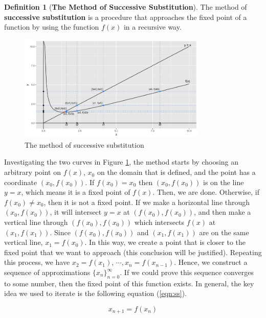 \documentclass{article}
\theoremstyle{definition}
\newtheorem{definition}{Definition}[section]
\theoremstyle{remark}
\theoremstyle{example}
\begin{document}
\begin{definition}[\textbf{The Method of Successive Substitution}]\label{def:MethodSS}
The method of \textbf{successive substitution} is a procedure that approaches the fixed point of a function by using the function $f(x)$ in a recursive way. 
\begin{figure}[H]
    \centering
    \includegraphics[width=0.8\textwidth]{Successive Approximation Visualization.png}
    \caption{\label{vis:V1}The method of successive substitution}
\end{figure}
Investigating the two curves in Figure \ref{vis:V1}, the method starts by choosing an arbitrary point on $f(x)$, $x_{0}$ on the domain that is defined, and the point has a coordinate $(x_0, f(x_0))$. If $f(x_0) = x_0$ then $(x_0, f(x_0))$ is on the line $y = x$, which means it is a fixed point of $f(x)$. Then, we are done. Otherwise, if $f(x_0) \neq x_0$, then it is not a fixed point. If we make a horizontal line through $(x_0,f(x_0))$, it will intersect $y = x$ at $(f(x_0),f(x_0))$, and then make a vertical line through $(f(x_0),f(x_0))$ which intersects $f(x)$ at $(x_1,f(x_1))$. Since $(f(x_0),f(x_0))$ and $(x_1,f(x_1))$ are on the same vertical line, $x_1 = f(x_0)$. In this way, we create a point that is closer to the fixed point that we want to approach (this conclusion will be justified). Repeating this process, we have $x_2 = f(x_1)$, $\cdots, x_n = f(x_{n-1})$. Hence, we construct a sequence of approximations $\{x_n\}_{n=0}^{\infty}$. If we could prove this sequence converges to some number, then the fixed point of this function exists. In general, the key idea we used to iterate is the following equation (\ref{eqn:ss}).

\begin{equation} \label{eqn:ss}
    x_{n+1} = f(x_{n})
\end{equation}

\end{definition}
\end{document}
